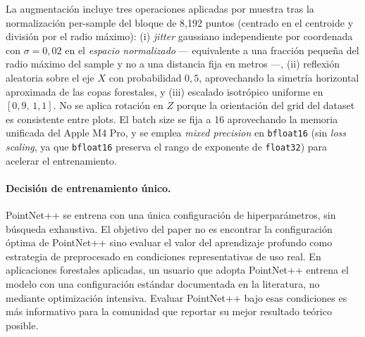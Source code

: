 \documentclass[runningheads]{llncs}
\begin{document}
La augmentaci\'on incluye tres operaciones aplicadas por muestra tras la normalizaci\'on per-sample del bloque de 8{,}192 puntos (centrado en el centroide y divisi\'on por el radio m\'aximo): (i) \emph{jitter} gaussiano independiente por coordenada con $\sigma = 0{,}02$ en el \emph{espacio normalizado} --- equivalente a una fracci\'on peque\~na del radio m\'aximo del sample y no a una distancia fija en metros ---, (ii) reflexi\'on aleatoria sobre el eje $X$ con probabilidad $0{,}5$, aprovechando la simetr\'ia horizontal aproximada de las copas forestales, y (iii) escalado isotr\'opico uniforme en $[0{,}9,\, 1{,}1]$. No se aplica rotaci\'on en $Z$ porque la orientaci\'on del grid del dataset es consistente entre plots. El batch size se fija a 16 aprovechando la memoria unificada del Apple M4 Pro, y se emplea \emph{mixed precision} en \texttt{bfloat16} (sin \emph{loss scaling}, ya que \texttt{bfloat16} preserva el rango de exponente de \texttt{float32}) para acelerar el entrenamiento.

\paragraph{Decisi\'on de entrenamiento \'unico.}
PointNet++ se entrena con una \'unica configuraci\'on de hiperpar\'ametros, sin b\'usqueda exhaustiva. El objetivo del paper no es encontrar la configuraci\'on \'optima de PointNet++ sino evaluar el valor del aprendizaje profundo como estrategia de preprocesado en condiciones representativas de uso real. En aplicaciones forestales aplicadas, un usuario que adopta PointNet++ entrena el modelo con una configuraci\'on est\'andar documentada en la literatura, no mediante optimizaci\'on intensiva. Evaluar PointNet++ bajo esas condiciones es m\'as informativo para la comunidad que reportar su mejor resultado te\'orico posible.
\end{document}
